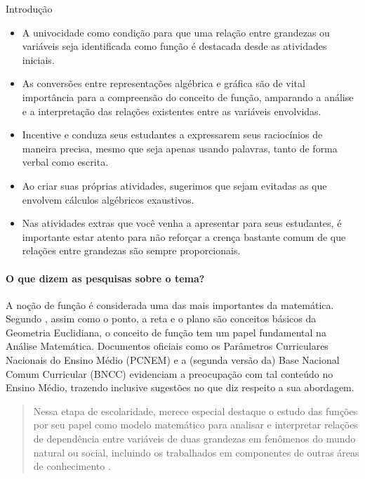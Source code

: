 \begin{apresentacao}{Introdução}
\begin{itemize}
\item {} 
A univocidade como condição para que uma relação entre grandezas ou variáveis seja identificada como função é destacada desde as atividades iniciais.

\item {} 
As conversões entre representações algébrica e gráfica são de vital importância para a compreensão do conceito de função, amparando a análise e a interpretação das relações existentes entre as variáveis envolvidas.

\item {} 
Incentive e conduza seus estudantes a expressarem seus raciocínios de maneira precisa, mesmo que seja apenas usando palavras, tanto de forma verbal como escrita.

\item {} 
Ao criar suas próprias atividades, sugerimos que sejam evitadas as que envolvem cálculos algébricos exaustivos.

\item {} 
Nas atividades extras que você venha a apresentar para seus estudantes, é importante estar atento para não reforçar a crença bastante comum de que relações entre grandezas são sempre proporcionais.

\end{itemize}

\paragraph{O que dizem as pesquisas sobre o tema?}

A noção de função é considerada uma das mais importantes da matemática. Segundo \cite{Ponte1992}, assim como o ponto, a reta e o plano são conceitos básicos da Geometria Euclidiana, o  conceito de função tem um papel fundamental na Análise Matemática. Documentos oficiais como os Parâmetros Curriculares Nacionais do Ensino Médio (PCNEM) e a (segunda versão da) Base Nacional Comum Curricular (BNCC)  evidenciam a preocupação com tal conteúdo no Ensino Médio, trazendo inclusive sugestões no que diz respeito a sua abordagem.
\begin{quote}

Nessa etapa de escolaridade, merece especial destaque o estudo das funções por seu papel como modelo matemático para analisar e interpretar relações de dependência entre variáveis de duas grandezas em fenômenos do mundo natural ou social, incluindo os trabalhados em componentes de outras áreas de conhecimento \citep[p.576]{BNCC2016}.


\end{quote}
\end{apresentacao}

